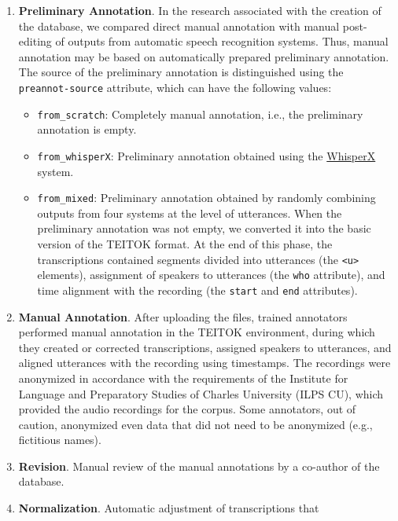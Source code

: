 \documentclass[
]{article}
\providecommand{\tightlist}{%
  \setlength{\itemsep}{0pt}\setlength{\parskip}{0pt}}
\begin{document}
\begin{enumerate}
\def\labelenumi{\arabic{enumi}.}
\tightlist
\item
  \textbf{Preliminary Annotation}. In the research associated with the
  creation of the database, we compared direct manual annotation with
  manual post-editing of outputs from automatic speech recognition
  systems. Thus, manual annotation may be based on automatically
  prepared preliminary annotation. The source of the preliminary
  annotation is distinguished using the \texttt{preannot-source}
  attribute, which can have the following values:

  \begin{itemize}
  \tightlist
  \item
    \texttt{from\_scratch}: Completely manual annotation, i.e., the
    preliminary annotation is empty.
  \item
    \texttt{from\_whisperX}: Preliminary annotation obtained using the
    \href{https://github.com/m-bain/whisperX}{WhisperX} system.
  \item
    \texttt{from\_mixed}: Preliminary annotation obtained by randomly
    combining outputs from four systems at the level of utterances. When
    the preliminary annotation was not empty, we converted it into the
    basic version of the TEITOK format. At the end of this phase, the
    transcriptions contained segments divided into utterances (the
    \texttt{\textless{}u\textgreater{}} elements), assignment of
    speakers to utterances (the \texttt{who} attribute), and time
    alignment with the recording (the \texttt{start} and \texttt{end}
    attributes).
  \end{itemize}
\item
  \textbf{Manual Annotation}. After uploading the files, trained
  annotators performed manual annotation in the TEITOK environment,
  during which they created or corrected transcriptions, assigned
  speakers to utterances, and aligned utterances with the recording
  using timestamps. The recordings were anonymized in accordance with
  the requirements of the Institute for Language and Preparatory Studies
  of Charles University (ILPS CU), which provided the audio recordings
  for the corpus. Some annotators, out of caution, anonymized even data
  that did not need to be anonymized (e.g., fictitious names).
\item
  \textbf{Revision}. Manual review of the manual annotations by a
  co-author of the database.
\item
  \textbf{Normalization}. Automatic adjustment of transcriptions that

\end{enumerate}
\end{document}
